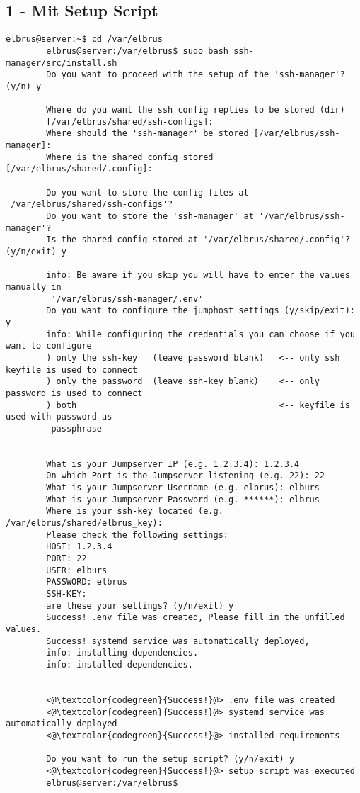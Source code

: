 	\subsection{1 - Mit Setup Script}
	
	\lstset{style=commands}
	\begin{lstlisting}[caption={Ausführen des 'install.sh' Scripts.}]
		elbrus@server:~$ cd /var/elbrus
		elbrus@server:/var/elbrus$ sudo bash ssh-manager/src/install.sh 
		Do you want to proceed with the setup of the 'ssh-manager'? (y/n) y
		
		Where do you want the ssh config replies to be stored (dir) 
		[/var/elbrus/shared/ssh-configs]:
		Where should the 'ssh-manager' be stored [/var/elbrus/ssh-manager]: 
		Where is the shared config stored [/var/elbrus/shared/.config]:
		
		Do you want to store the config files at '/var/elbrus/shared/ssh-configs'?
		Do you want to store the 'ssh-manager' at '/var/elbrus/ssh-manager'?
		Is the shared config stored at '/var/elbrus/shared/.config'? (y/n/exit) y
		
		info: Be aware if you skip you will have to enter the values manually in
		 '/var/elbrus/ssh-manager/.env'
		Do you want to configure the jumphost settings (y/skip/exit): y
		info: While configuring the credentials you can choose if you want to configure
		) only the ssh-key   (leave password blank)   <-- only ssh keyfile is used to connect
		) only the password  (leave ssh-key blank)    <-- only password is used to connect
		) both                                        <-- keyfile is used with password as 
		 passphrase
		
		
		What is your Jumpserver IP (e.g. 1.2.3.4): 1.2.3.4
		On which Port is the Jumpserver listening (e.g. 22): 22
		What is your Jumpserver Username (e.g. elbrus): elburs
		What is your Jumpserver Password (e.g. ******): elbrus
		Where is your ssh-key located (e.g. /var/elbrus/shared/elbrus_key):
		Please check the following settings:
		HOST: 1.2.3.4
		PORT: 22
		USER: elburs
		PASSWORD: elbrus
		SSH-KEY:
		are these your settings? (y/n/exit) y
		Success! .env file was created, Please fill in the unfilled values.
		Success! systemd service was automatically deployed,
		info: installing dependencies.
		info: installed dependencies.
		
		
		<@\textcolor{codegreen}{Success!}@> .env file was created
		<@\textcolor{codegreen}{Success!}@> systemd service was automatically deployed
		<@\textcolor{codegreen}{Success!}@> installed requirements
		
		Do you want to run the setup script? (y/n/exit) y
		<@\textcolor{codegreen}{Success!}@> setup script was executed
		elbrus@server:/var/elbrus$
	\end{lstlisting}
	\newpage
	
